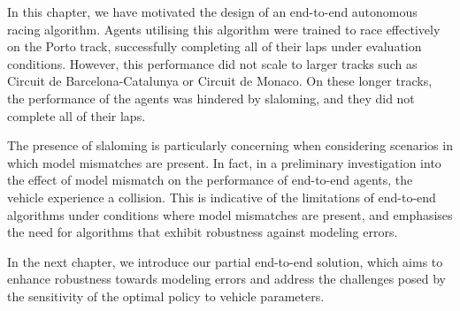 In this chapter, we have motivated the design of an end-to-end autonomous racing algorithm.
Agents utilising this algorithm were trained to race effectively on the Porto track, successfully completing all of their laps under evaluation conditions.
However, this performance did not scale to larger tracks such as Circuit de Barcelona-Catalunya or Circuit de Monaco.
On these longer tracks, the performance of the agents was hindered by slaloming, and they did not complete all of their laps.

The presence of slaloming is particularly concerning when considering scenarios in which model mismatches are present.
In fact, in a preliminary investigation into the effect of model mismatch on the performance of end-to-end agents, the vehicle experience a collision.
This is indicative of the limitations of end-to-end algorithms under conditions where model mismatches are present, and emphasises the need for algorithms that exhibit robustness against modeling errors.

In the next chapter, we introduce our partial end-to-end solution, which aims to enhance robustness towards modeling errors and address the challenges posed by the sensitivity of the optimal policy to vehicle parameters.